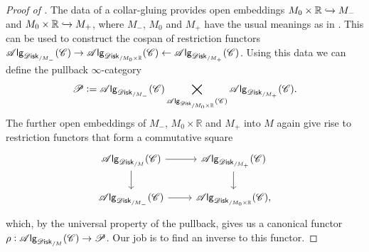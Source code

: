 \documentclass[../text]{subfiles}
\begin{document}
\begin{proof}[Proof of ]
    The data of a collar-gluing provides open embeddings $M_0 \times \mathbb{R} \xhookrightarrow{} M_-$ and $M_0 \times \mathbb{R} \xhookrightarrow{} M_+$, where $M_-$, $M_0$ and $M_+$ have the usual meanings as in . This can be used to construct the cospan of restriction functors $\alg{\disk_{/M_-}} (\catC) \rightarrow \alg{\disk_{/M_0 \times \mathbb{R}}} (\catC) \leftarrow \alg{\disk_{/M_+}} (\catC)$. Using this data we can define the pullback $\infty$-category
    \begin{equation}
        \mathscr{P} := \alg{\disk_{/M_-}} (\catC) \bigtimes_{\alg{\disk_{/M_0 \times \mathbb{R}}} (\catC)} \alg{\disk_{/M_+}} (\catC).
    \end{equation}
    The further open embeddings of $M_-$, $M_0 \times \mathbb{R}$ and $M_+$ into $M$ again give rise to restriction functors that form a commutative square
    \begin{equation}
        \begin{tikzcd}
            \alg{\disk_{/M}} (\catC) \arrow[r] \arrow[d] & \alg{\disk_{/M_+}} (\catC) \arrow[d] \\
            \alg{\disk_{/M_-}} (\catC) \arrow[r] & \alg{\disk_{/M_0 \times \mathbb{R}}} (\catC),
        \end{tikzcd}
    \end{equation}
    which, by the universal property of the pullback, gives us a canonical functor $\rho: \alg{\disk_{/M}} (\catC) \rightarrow \mathscr{P}$. Our job is to find an inverse to this functor.
    

\end{proof}
\end{document}
